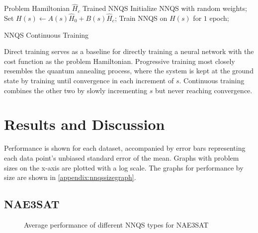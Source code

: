 \begin{algorithm}
    \begin{algorithmic}
    \Require Problem Hamiltonian $\hat{H}_c$
    \Ensure Trained NNQS
    \State Initialize NNQS with random weights;
    \State Set $H(s) \leftarrow A(s)\hat{H}_0 + B(s)\hat{H}_c$;
    \State Train NNQS on $H(s)$ for $1$ epoch;
    \EndFor
    \end{algorithmic}
    \caption{NNQS Continuous Training}
    \label{alg:continuous}
\end{algorithm}

Direct training serves as a baseline for directly training a neural network with the cost function as the problem Hamiltonian. Progressive training most closely resembles the quantum annealing process, where the system is kept at the ground state by training until convergence in each increment of $s$. Continuous training combines the other two by slowly incrementing $s$ but never reaching convergence.

\section{Results and Discussion}
Performance is shown for each dataset, accompanied by error bars representing each data point's unbiased standard error of the mean. Graphs with problem sizes on the x-axis are plotted with a log scale. The graphs for performance by size are shown in \autoref{appendix:nnqssizegraph}.

\subsection{NAE3SAT}

\begin{figure}[!htb]
    \centering
    \hfill
    \caption{Average performance of different NNQS types for NAE3SAT}
    \label{nnqs-nae3sat-average}
\end{figure}

